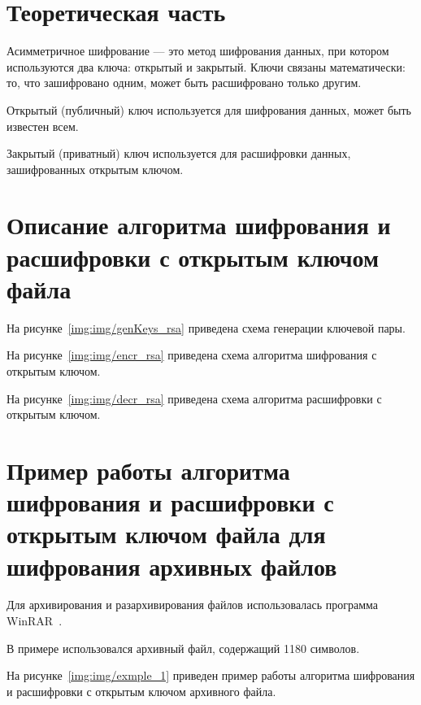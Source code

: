 \chapter{Теоретическая часть}

Асимметричное шифрование — это метод шифрования данных, при котором используются два ключа: открытый и закрытый. Ключи связаны математически: то, что зашифровано одним, может быть расшифровано только другим. 

Открытый (публичный) ключ используется для шифрования данных, может быть известен всем.

Закрытый (приватный) ключ используется для расшифровки данных, зашифрованных открытым ключом.


\chapter{Описание алгоритма шифрования и расшифровки с открытым ключом файла}

На рисунке~\ref{img:img/genKeys_rsa} приведена схема генерации ключевой пары.

\FloatBarrier
{}
\FloatBarrier

На рисунке~\ref{img:img/encr_rsa} приведена схема алгоритма шифрования с открытым ключом.

\FloatBarrier
{}
\FloatBarrier

На рисунке~\ref{img:img/decr_rsa} приведена схема алгоритма расшифровки с открытым ключом.

\FloatBarrier
{}
\FloatBarrier

\chapter{Пример работы алгоритма шифрования и расшифровки с открытым ключом файла для шифрования архивных файлов}

Для архивирования и разархивирования файлов использовалась программа WinRAR~\cite{winrar}.


В примере использовался архивный файл, содержащий 1180 символов. 

На рисунке~\ref{img:img/exmple_1} приведен пример работы алгоритма шифрования и расшифровки с открытым ключом архивного файла.

\FloatBarrier
{}
\FloatBarrier

